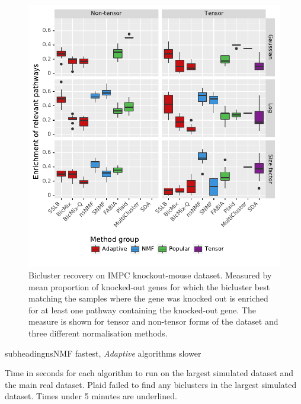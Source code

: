 \documentclass[xcolor=table,final]{beamer}
\newlength{\onecolwid}
\newlength{\twocolwid}
\newcommand{\kcnsubheading}[1]{\begin{beamercolorbox}[rounded=true]{subheading}{\large #1}\end{beamercolorbox}}
\begin{document}
\begin{frame}[t]
\begin{columns}[t]
\begin{column}{\twocolwid}
\begin{columns}
\begin{column}{\onecolwid}
\begin{figure}
\includegraphics[width=0.9 \textwidth]{plots/compare_samegenes_K_50_datasets_ko_traits_nz_alpha_0-05.pdf}
\caption{Bicluster recovery on IMPC knockout-mouse dataset. Measured by mean proportion of knocked-out genes for which the bicluster best matching the samples where the gene was knocked out is enriched for at least one pathway containing the knocked-out gene. The measure is shown for tensor and non-tensor forms of the dataset and three different normalisation methods.}
\end{figure}

\kcnsubheading{nsNMF fastest, \textit{Adaptive} algorithms slower}

\begin{table}[t!]
\caption{Time in seconds for each algorithm to run on the largest simulated dataset and the main real dataset. Plaid failed to find any biclusters in the largest simulated dataset. Times under 5 minutes are underlined.}


\end{table}
\end{column}
\end{columns}
\end{column}
\end{columns}
\end{frame}
\end{document}
